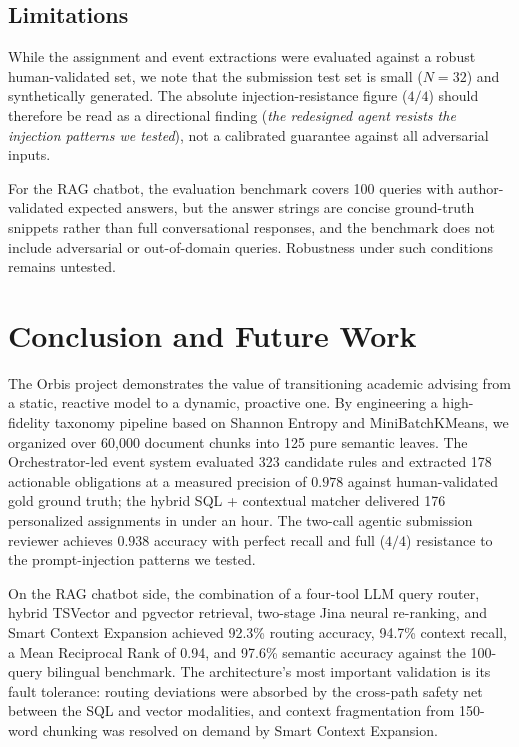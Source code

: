 \documentclass[a4paper,12pt]{article}
\begin{document}
\subsection{Limitations}
\label{sec:limitations}
While the assignment and event extractions were evaluated against a robust human-validated set, we note that the submission test set is small ($N{=}32$) and synthetically generated. The absolute injection-resistance figure ($4/4$) should therefore be read as a directional finding (\emph{the redesigned agent resists the injection patterns we tested}), not a calibrated guarantee against all adversarial inputs.

For the RAG chatbot, the evaluation benchmark covers 100 queries with author-validated expected answers, but the answer strings are concise ground-truth snippets rather than full conversational responses, and the benchmark does not include adversarial or out-of-domain queries. Robustness under such conditions remains untested.

\section{Conclusion and Future Work}
\label{sec:conclusion}
The Orbis project demonstrates the value of transitioning academic advising from a static, reactive model to a dynamic, proactive one. By engineering a high-fidelity taxonomy pipeline based on Shannon Entropy and MiniBatchKMeans, we organized over 60{,}000 document chunks into 125 pure semantic leaves. The Orchestrator-led event system evaluated 323 candidate rules and extracted 178 actionable obligations at a measured precision of $0.978$ against human-validated gold ground truth; the hybrid SQL + contextual matcher delivered 176 personalized assignments in under an hour. The two-call agentic submission reviewer achieves $0.938$ accuracy with perfect recall and full ($4/4$) resistance to the prompt-injection patterns we tested.

On the RAG chatbot side, the combination of a four-tool LLM query router, hybrid TSVector and pgvector retrieval, two-stage Jina neural re-ranking, and Smart Context Expansion achieved 92.3\% routing accuracy, 94.7\% context recall, a Mean Reciprocal Rank of 0.94, and 97.6\% semantic accuracy against the 100-query bilingual benchmark. The architecture's most important validation is its fault tolerance: routing deviations were absorbed by the cross-path safety net between the SQL and vector modalities, and context fragmentation from 150-word chunking was resolved on demand by Smart Context Expansion.
\end{document}
